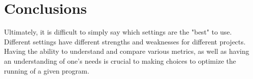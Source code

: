 \documentclass{article}
\begin{document}
\section{Conclusions}
Ultimately, it is difficult to simply say which settings are the "best" to use.  Different settings have different strengths and weaknesses for different projects.  Having the ability to understand and compare various metrics, as well as having an understanding of one's needs is crucial to making choices to optimize the running of a given program.
\end{document}

